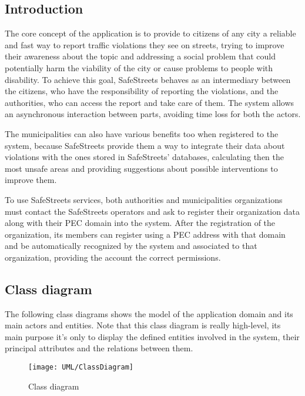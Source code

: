 \subsection{Introduction}
The core concept of the application is to provide to citizens of any city a reliable and fast way to report traffic violations they see on streets, trying to improve their awareness about the topic and addressing a social problem that could potentially harm the viability of the city or cause problems to people with disability. To achieve this goal, SafeStreets behaves as an intermediary between the citizens, who have the responsibility of reporting the violations, and the authorities, who can access the report and take care of them. The system allows an asynchronous interaction between parts, avoiding time loss for both the actors.

The municipalities can also have various benefits too when registered to the system, because SafeStreets provide them a way to integrate their data about violations with the ones stored in SafeStreets' databases, calculating then the most unsafe areas and providing suggestions about possible interventions to improve them.

To use SafeStreets services, both authorities and municipalities organizations must contact the SafeStreets operators and ask to register their organization data along with their PEC domain into the system. After the registration of the organization, its members can register using a PEC address with that domain and be automatically recognized by the system and associated to that organization, providing the account the correct permissions.

\subsection{Class diagram}

The following class diagrams shows the model of the application domain and its main actors and entities. Note that this class diagram is really high-level, its main purpose it's only to display the defined entities involved in the system, their principal attributes and the relations between them.

\begin{figure}[H]
	\centering
	\texttt{[image: UML/ClassDiagram]}
	\caption{Class diagram}
\end{figure}

